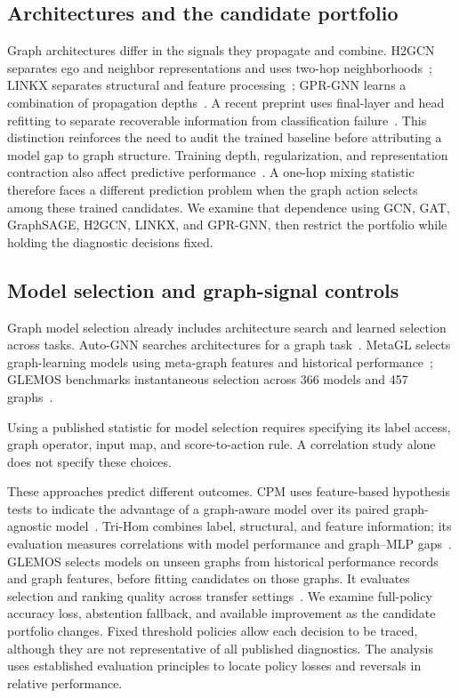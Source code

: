 \subsection{Architectures and the candidate portfolio}

Graph architectures differ in the signals they propagate and combine. H2GCN separates ego and neighbor representations and uses two-hop neighborhoods~\citep{zhu2020beyond}; LINKX separates structural and feature processing~\citep{lim2021linkx}; GPR-GNN learns a combination of propagation depths~\citep{chien2021gprgnn}. A recent preprint uses final-layer and head refitting to separate recoverable information from classification failure~\citep{ness2026rarity}. This distinction reinforces the need to audit the trained baseline before attributing a model gap to graph structure. Training depth, regularization, and representation contraction also affect predictive performance~\citep{oono2020exponential,chen2020measuring,rong2020dropedge,zhao2020pairnorm}. A one-hop mixing statistic therefore faces a different prediction problem when the graph action selects among these trained candidates. We examine that dependence using GCN, GAT, GraphSAGE, H2GCN, LINKX, and GPR-GNN, then restrict the portfolio while holding the diagnostic decisions fixed.

\subsection{Model selection and graph-signal controls}

Graph model selection already includes architecture search and learned selection across tasks. Auto-GNN searches architectures for a graph task~\citep{zhou2020autognn}. MetaGL selects graph-learning models using meta-graph features and historical performance~\citep{park2023metagl}; GLEMOS benchmarks instantaneous selection across 366 models and 457 graphs~\citep{park2023glemos}.

Using a published statistic for model selection requires specifying its label access, graph operator, input map, and score-to-action rule. A correlation study alone does not specify these choices.

These approaches predict different outcomes. CPM uses feature-based hypothesis tests to indicate the advantage of a graph-aware model over its paired graph-agnostic model~\citep{luan2023whendo}. Tri-Hom combines label, structural, and feature information; its evaluation measures correlations with model performance and graph--MLP gaps~\citep{zheng2024trihom}. GLEMOS selects models on unseen graphs from historical performance records and graph features, before fitting candidates on those graphs. It evaluates selection and ranking quality across transfer settings~\citep{park2023glemos}. We examine full-policy accuracy loss, abstention fallback, and available improvement as the candidate portfolio changes. Fixed threshold policies allow each decision to be traced, although they are not representative of all published diagnostics. The analysis uses established evaluation principles to locate policy losses and reversals in relative performance.

